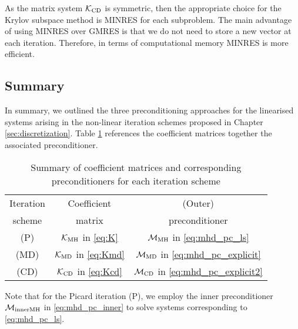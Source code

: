As the matrix system $\mathcal{K}_{\rm CD}$ is symmetric, then the appropriate choice for the Krylov subspace method is MINRES for each subproblem. The main advantage of using MINRES over GMRES is that we do not need to store a new vector at each iteration. Therefore, in terms of computational memory MINRES is more efficient.


\subsection{Summary}

In summary, we outlined the three preconditioning approaches for the linearised systems arising in the non-linear iteration schemes proposed in Chapter \ref{sec:discretization}. Table \ref{tab:SummaryTable} references the coefficient matrices together the associated preconditioner.
\begin{table}[h!]
\begin{center}
\begin{tabular}{|c|c|c|}
\hline
  Iteration & Coefficient & (Outer) \\
  scheme & matrix & preconditioner\\
\hline
\rule{0pt}{12pt}(P) & $\mathcal{K}_{\rm MH}$ in \eqref{eq:K}& $\mathcal{M}_{\rm MH}$ in \eqref{eq:mhd_pc_ls}  \\[0.1cm]
\hline
\rule{0pt}{12pt}(MD) & $\mathcal{K}_{\rm MD}$ in \eqref{eq:Kmd}& $\mathcal{M}_{\rm MD}$ in \eqref{eq:mhd_pc_explicit}  \\[0.1cm]
\hline
\rule{0pt}{12pt}(CD) & $\mathcal{K}_{\rm CD}$ in \eqref{eq:Kcd}&$\mathcal{M}_{\rm CD}$ in \eqref{eq:mhd_pc_explicit2}\\[0.1cm]
\hline
\end{tabular}
\caption{Summary of coefficient matrices and corresponding preconditioners for each iteration scheme}
\label{tab:SummaryTable}
\end{center}
\end{table}

\noindent Note that for the Picard iteration (P), we employ the inner preconditioner $\mathcal{M}_{\rm innerMH}$ in \eqref{eq:mhd_pc_inner} to solve systems corresponding to \eqref{eq:mhd_pc_ls}.

